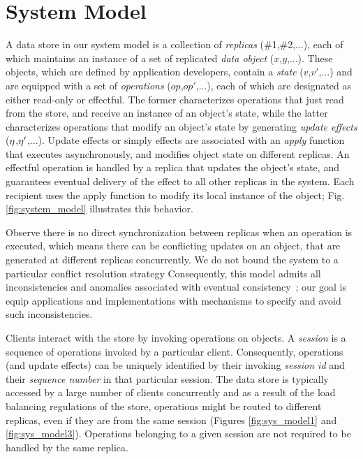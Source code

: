 \newpage
\section{System Model}
\label{sec:sys_model}

A data store in our system model is a collection of \emph{replicas}
(\#1,\#2,...), each of which maintains an instance of a set of
replicated \emph{data object} ($x$,$y$,...).  These objects, which are
defined by application developers, contain a \emph{state}
($v$,$v'$,...) and are equipped with a set of \emph{operations}
($op$,$op'$,...), each of which are designated as either read-only or
effectful.  The former characterizes operations that just read from
the store, and receive an instance of an object's state, while the
latter characterizes operations that modify an object's state by
generating \emph{update effects} ($\eta$,$\eta'$,...).  Update effects
or simply effects are associated with an \emph{apply} function that
executes asynchronously, and modifies object state on different
replicas.  An effectful operation is handled by a replica that updates
the object's state, and guarantees eventual delivery of the effect to
all other replicas in the system. Each recipient uses the apply
function to modify its local instance of the object;
Fig.\ref{fig:system_model} illustrates this behavior.

Observe there is no direct synchronization between replicas when an
operation is executed, which means there can be conflicting updates on
an object, that are generated at different replicas concurrently.  We
do not bound the system to a particular conflict resolution strategy
Consequently, this model admits all inconsistencies and anomalies
associated with eventual consistency~\cite{quelea}; our goal is equip
applications and implementations with mechanisms to specify and avoid
such inconsistencies.

Clients interact with the store by invoking operations on objects.
A \emph{session} is a sequence of operations invoked by a particular
client. Consequently, operations (and update effects) can be uniquely
identified by their invoking \emph{session id} and
their \emph{sequence number} in that particular session. The data
store is typically accessed by a large number of clients concurrently
and as a result of the load balancing regulations of the store,
operations might be routed to different replicas, even if they are
from the same session (Figures \ref{fig:sys_model1} and
\ref{fig:sys_model3}).  Operations belonging to a given session are
not required to be handled by the same replica.

